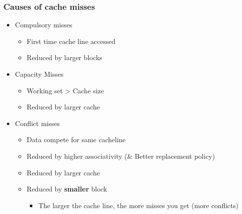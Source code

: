 \documentclass{article}
\begin{document}
		\subsubsection{Causes of cache misses}
			\begin{itemize}
				\item Compulsory misses
				\begin{itemize}
					\item First time cache line accessed
					\item Reduced by larger blocks
				\end{itemize}

				\item Capacity Misses
				\begin{itemize}
					\item Working set > Cache size
					\item Reduced by larger cache
				\end{itemize}

				\item Conflict misses
				\begin{itemize}
					\item Data compete for same cacheline
					\item Reduced by higher associativity (\& Better replacement policy)
					\item Reduced by larger cache
					\item Reduced by \textbf{smaller} block
					\begin{itemize}
						\item The larger the cache line, the more misses you get (more conflicts)
					\end{itemize}
				\end{itemize}
			\end{itemize}
\end{document}
